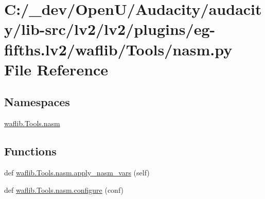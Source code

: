 \hypertarget{lv2_2plugins_2eg-fifths_8lv2_2waflib_2_tools_2nasm_8py}{}\section{C\+:/\+\_\+dev/\+Open\+U/\+Audacity/audacity/lib-\/src/lv2/lv2/plugins/eg-\/fifths.lv2/waflib/\+Tools/nasm.py File Reference}
\label{lv2_2plugins_2eg-fifths_8lv2_2waflib_2_tools_2nasm_8py}
\subsection*{Namespaces}
\begin{DoxyCompactItemize}
\item 
 \hyperlink{namespacewaflib_1_1_tools_1_1nasm}{waflib.\+Tools.\+nasm}
\end{DoxyCompactItemize}
\subsection*{Functions}
\begin{DoxyCompactItemize}
\item 
def \hyperlink{namespacewaflib_1_1_tools_1_1nasm_a43879d6ce11e92cbb0978a352bf863ce}{waflib.\+Tools.\+nasm.\+apply\+\_\+nasm\+\_\+vars} (self)
\item 
def \hyperlink{namespacewaflib_1_1_tools_1_1nasm_aeea053be55b9909c496dfe1a4d62ce68}{waflib.\+Tools.\+nasm.\+configure} (conf)
\end{DoxyCompactItemize}

